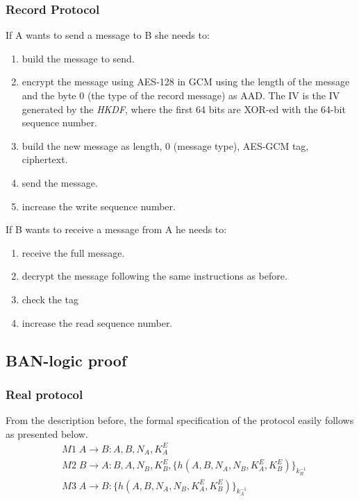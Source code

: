 \subsubsection{Record Protocol}
If A wants to send a message to B she needs to:
\begin{enumerate}
    \item build the message to send.
    \item encrypt the message using AES-128 in GCM using the length of the 
        message and the byte 0 (the type of the record message) as AAD. The IV
        is the IV generated by the \emph{HKDF}, where the first 64 bits are 
        XOR-ed with the 64-bit sequence number.
    \item build the new message as length, 0 (message type), AES-GCM tag, 
        ciphertext.
    \item send the message.
    \item increase the write sequence number.
\end{enumerate}

If B wants to receive a message from A he needs to:
\begin{enumerate}
    \item receive the full message.
    \item decrypt the message following the same instructions as before.
    \item check the tag
    \item increase the read sequence number.
\end{enumerate}

\subsection{BAN-logic proof}
\subsubsection{Real protocol}
From the description before, the formal specification of the protocol easily 
follows as presented below.
\begin{align*}
    &M1 \; A \rightarrow B : A, B, N_A, K_A^E \\
    &M2 \; B \rightarrow A : B, A, N_B, K_B^E, \{h(A,B,N_A,N_B,K_A^E,K_B^E)\}_{k_B^{-1}} \\
    &M3 \; A \rightarrow B : \{h(A,B,N_A,N_B,K_A^E,K_B^E)\}_{k_A^{-1}}
\end{align*}

